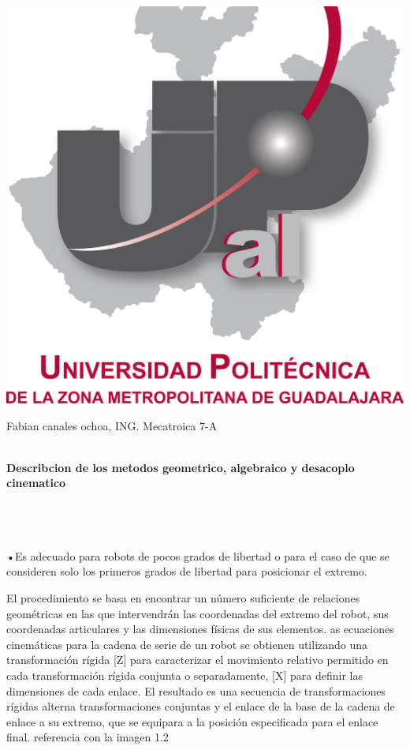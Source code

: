 \documentclass[10pt,a4paper]{article}
\begin{document}
\begin{center}
\includegraphics[scale=0.2]{imagenes/upzmg.png} 
\end{center}
\large \huge Fabian canales ochoa, ING. Mecatroica 7-A
\\ \\ 
\begin{huge}
\textbf{Describcion de los metodos geometrico, algebraico y desacoplo cinematico}
\end{huge}
 \begin{Large} \\ \\ \\
•Es adecuado para robots de pocos grados de libertad o para el caso de que se consideren solo los primeros grados de libertad para posicionar el extremo.

El procedimiento se basa en encontrar un número suficiente de relaciones geométricas en las que intervendrán las coordenadas del extremo del robot, sus coordenadas articulares y las dimensiones físicas de sus elementos. as ecuaciones cinemáticas para la cadena de serie de un robot se obtienen utilizando una transformación rígida [Z] para caracterizar el movimiento relativo permitido en cada transformación rígida conjunta o separadamente, [X] para definir las dimensiones de cada enlace. El resultado es una secuencia de transformaciones rígidas alterna transformaciones conjuntas y el enlace de la base de la cadena de enlace a su extremo, que se equipara a la posición especificada para el enlace final. referencia con la imagen 1.2
\end{Large}
\end{document}
